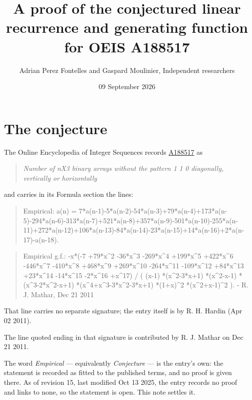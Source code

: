 \documentclass[11pt]{article}
\title{A proof of the conjectured linear recurrence and generating function for OEIS A188517}
\author{Adrian Perez Fontelles and Gaspard Moulinier, Independent researchers}
\date{09 September 2026}
\theoremstyle{definition}
\begin{document}
\maketitle
\section{The conjecture}

The Online Encyclopedia of Integer Sequences records \href{https://oeis.org/A188517}{A188517} as

\begin{quote}\itshape Number of nX3 binary arrays without the pattern 1 1 0 diagonally, vertically or horizontally\end{quote}

and carries in its Formula section the lines:

\begin{quote}\ttfamily Empirical: a(n) = 7*a(n-1)-5*a(n-2)-54*a(n-3)+79*a(n-4)+173*a(n-5)-294*a(n-6)-313*a(n-7)+521*a(n-8)+357*a(n-9)-501*a(n-10)-255*a(n-11)+272*a(n-12)+106*a(n-13)-84*a(n-14)-23*a(n-15)+14*a(n-16)+2*a(n-17)-a(n-18).\end{quote}

\begin{quote}\ttfamily Empirical g.f.: -x*(-7 +79*x\textasciicircum{}2 -36*x\textasciicircum{}3 -269*x\textasciicircum{}4 +199*x\textasciicircum{}5 +422*x\textasciicircum{}6 -446*x\textasciicircum{}7 -410*x\textasciicircum{}8 +468*x\textasciicircum{}9 +269*x\textasciicircum{}10 -264*x\textasciicircum{}11 -109*x\textasciicircum{}12 +84*x\textasciicircum{}13 +23*x\textasciicircum{}14 -14*x\textasciicircum{}15 -2*x\textasciicircum{}16 +x\textasciicircum{}17) / ( (x-1) *(x\textasciicircum{}2-3*x+1) *(x\textasciicircum{}2-x-1) *(x\textasciicircum{}3-2*x\textasciicircum{}2-x+1) *(x\textasciicircum{}4+x\textasciicircum{}3-3*x\textasciicircum{}2-3*x+1) *(1+x)\textasciicircum{}2 *(x\textasciicircum{}2+x-1)\textasciicircum{}2 ). - R. J. Mathar, Dec 21 2011\end{quote}

That line carries no separate signature; the entry itself is by R. H. Hardin (Apr 02 2011).

The line quoted ending in that signature is contributed by R. J. Mathar on Dec 21 2011.

The word {\itshape Empirical} --- equivalently {\itshape Conjecture} --- is the entry's own: the statement is recorded as fitted to the published terms, and no proof is given there. As of revision 15, last modified Oct 13 2025, the entry records no proof and links to none, so the statement is open. This note settles it.
\end{document}
